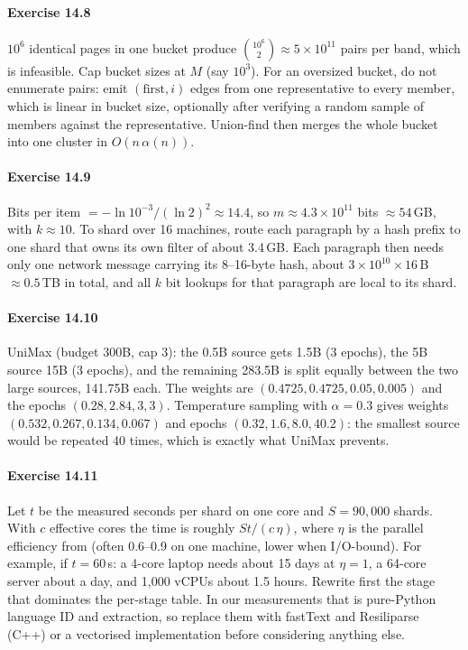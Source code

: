 \paragraph{Exercise 14.8} $10^{6}$ identical pages in one bucket produce
$\binom{10^6}{2}\approx5\times10^{11}$ pairs per band, which is infeasible. Cap bucket sizes at $M$
(say $10^{3}$). For an oversized bucket, do not enumerate pairs: emit $(\text{first},i)$ edges from
one representative to every member, which is linear in bucket size, optionally after verifying a
random sample of members against the representative. Union-find then merges the whole bucket into one
cluster in $O(n\,\alpha(n))$.

\paragraph{Exercise 14.9} Bits per item $= -\ln 10^{-3}/(\ln2)^2\approx14.4$, so
$m\approx4.3\times10^{11}$ bits $\approx54$\,GB, with $k\approx10$. To shard over 16 machines, route
each paragraph by a hash prefix to one shard that owns its own filter of about 3.4\,GB. Each paragraph then
needs only one network message carrying its 8--16-byte hash, about $3\times10^{10}\times16$\,B $\approx
0.5$\,TB in total, and all $k$ bit lookups for that paragraph are local to its shard.

\paragraph{Exercise 14.10} UniMax (budget 300B, cap 3): the 0.5B source gets 1.5B (3 epochs), the 5B
source 15B (3 epochs), and the remaining 283.5B is split equally between the two large sources, 141.75B
each. The weights are $(0.4725, 0.4725, 0.05, 0.005)$ and the epochs $(0.28, 2.84, 3, 3)$. Temperature sampling
with $\alpha=0.3$ gives weights $(0.532,0.267,0.134,0.067)$ and epochs $(0.32, 1.6, 8.0, 40.2)$: the
smallest source would be repeated 40 times, which is exactly what UniMax prevents.

\paragraph{Exercise 14.11} Let $t$ be the measured seconds per shard on one core and $S=90{,}000$
shards. With $c$ effective cores the time is roughly $S t / (c\,\eta)$, where $\eta$ is the parallel efficiency
from  (often 0.6--0.9 on one machine, lower when I/O-bound). For example, if
$t=60$\,s: a 4-core laptop needs about 15 days at $\eta=1$, a 64-core server about a day, and 1{,}000 vCPUs about 1.5
hours. Rewrite first the stage that dominates the per-stage table. In our measurements that is
pure-Python language ID and extraction, so replace them with fastText and Resiliparse (C++)
or a vectorised implementation before considering anything else.
